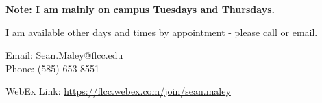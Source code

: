 \documentclass[11pt]{article} %
\begin{document}
	\begin{center}
		
		\textbf{\large Note: I am mainly on campus Tuesdays and Thursdays. } 
		\medskip
		
		I am available other days and times by appointment - please call or email.

%		
%		
		
		 Email: Sean.Maley@flcc.edu\\
		 
		 Phone: (585) 653-8551
			
		 WebEx Link: \textcolor{blue}{\url{https://flcc.webex.com/join/sean.maley}}
			

			

		
		
%		
%		
%	
	\end{center}
	
	
	
\end{document}
